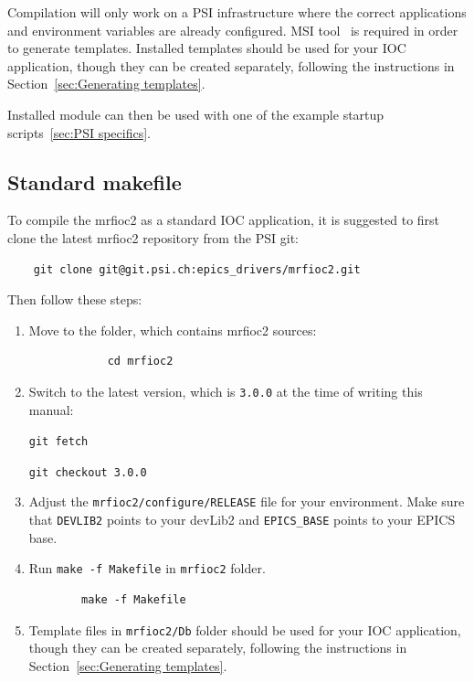 \documentclass[12pt,a4paper]{article}
\newcommand{\latestDriverVersion}{3.0.0}
\begin{document}
Compilation will only work on a PSI infrastructure where the correct applications and environment variables are already configured. MSI tool~\cite{msi} is required in order to generate templates. Installed templates should be used for your IOC application, though they can be created separately, following the instructions in Section~\ref{sec:Generating templates}.

Installed module can then be used with one of the example startup scripts~\ref{sec:PSI specifics}.

\subsection{Standard makefile}\label{sec:Standard makefile}
To compile the mrfioc2 as a standard IOC application, it is suggested to first clone the latest mrfioc2 repository from the PSI git: 
\begin{verbatim}
	git clone git@git.psi.ch:epics_drivers/mrfioc2.git
\end{verbatim}

Then follow these steps:
\begin{enumerate}
	\item 
		Move to the folder, which contains mrfioc2 sources:
		\begin{verbatim}
			cd mrfioc2
		\end{verbatim}
		
	\item 
		Switch to the latest version, which is \texttt{\latestDriverVersion} at the time of writing this manual:
		
		\texttt{git fetch}
		
		\texttt{git checkout \latestDriverVersion}
		
	\item 
		Adjust the \texttt{mrfioc2/configure/RELEASE} file for your environment. Make sure that \texttt{DEVLIB2} points to your devLib2 and \texttt{EPICS\_BASE} points to your EPICS base.
	\item 
		Run \texttt{make -f Makefile} in \texttt{mrfioc2} folder.
		\begin{verbatim}
		make -f Makefile
		\end{verbatim}
	\item 
		Template files in \texttt{mrfioc2/Db} folder should be used for your IOC application, though they can be created separately, following the instructions in Section~\ref{sec:Generating templates}.
\end{enumerate}
\end{document}
